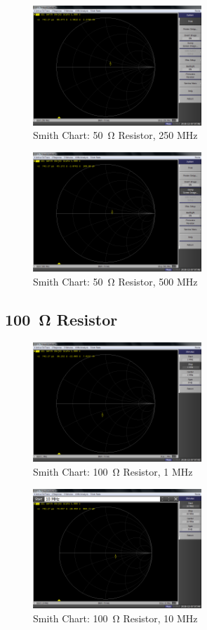 \documentclass[conference]{IEEEtran}
\begin{document}
\begin{figure}[H]
  \centering
  \includegraphics[width=2.5in]{./img/smith_50_ohms_250_MHz.png}
  \caption{Smith Chart: \SI{50}{\ohm} Resistor, 250 MHz}
  \label{fig:smith_50_ohms_250_MHz}
\end{figure}

\begin{figure}[H]
  \centering
  \includegraphics[width=2.5in]{./img/smith_50_ohms_500_MHz.png}
  \caption{Smith Chart: \SI{50}{\ohm} Resistor, 500 MHz}
  \label{fig:smith_50_ohms_500_MHz}
\end{figure}

\subsection{\SI{100}{\ohm} Resistor}

\begin{figure}[H]
  \centering
  \includegraphics[width=2.5in]{./img/smith_100_ohms_1_MHz.png}
  \caption{Smith Chart: \SI{100}{\ohm} Resistor, 1 MHz}
  \label{fig:smith_100_ohms_1_MHz}
\end{figure}

\begin{figure}[H]
  \centering
  \includegraphics[width=2.5in]{./img/smith_100_ohms_10_MHz.png}
  \caption{Smith Chart: \SI{100}{\ohm} Resistor, 10 MHz}
  \label{fig:smith_100_ohms_10_MHz}
\end{figure}
\end{document}
